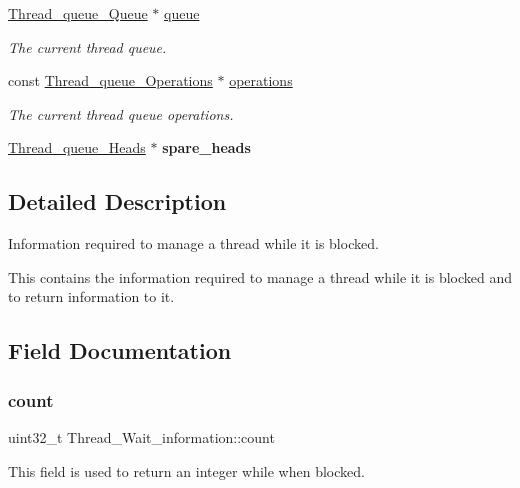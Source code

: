 \begin{DoxyCompactItemize}
\mbox{\hyperlink{structThread__queue__Queue}{Thread\+\_\+queue\+\_\+\+Queue}} $\ast$ \mbox{\hyperlink{structThread__Wait__information_a4a6e5aabcc6e723585fb7528bee8090f}{queue}}
\begin{DoxyCompactList}\small\item\em The current thread queue. \end{DoxyCompactList}\item 
const \mbox{\hyperlink{structThread__queue__Operations}{Thread\+\_\+queue\+\_\+\+Operations}} $\ast$ \mbox{\hyperlink{structThread__Wait__information_aaa52b4e6e2953ad58ca89ccbf077d3b2}{operations}}
\begin{DoxyCompactList}\small\item\em The current thread queue operations. \end{DoxyCompactList}\item 
\mbox{\label{structThread__Wait__information_a6867b5c41094e493a5c5d94f7a51b83a}} 
\mbox{\hyperlink{group__RTEMSScoreThreadQueue_gaebac32033b009cc8f606a90bd389f8e9}{Thread\+\_\+queue\+\_\+\+Heads}} $\ast$ {\bfseries spare\+\_\+heads}
\end{DoxyCompactItemize}


\subsection{Detailed Description}
Information required to manage a thread while it is blocked. 

This contains the information required to manage a thread while it is blocked and to return information to it. 

\subsection{Field Documentation}
\mbox{\label{structThread__Wait__information_a5d1ed6ffcab7db372e326fa698ce0b1b}} 
\subsubsection{\texorpdfstring{count}{count}}
{\footnotesize\ttfamily uint32\+\_\+t Thread\+\_\+\+Wait\+\_\+information\+::count}

This field is used to return an integer while when blocked. \mbox{\label{structThread__Wait__information_aaa52b4e6e2953ad58ca89ccbf077d3b2}} 
